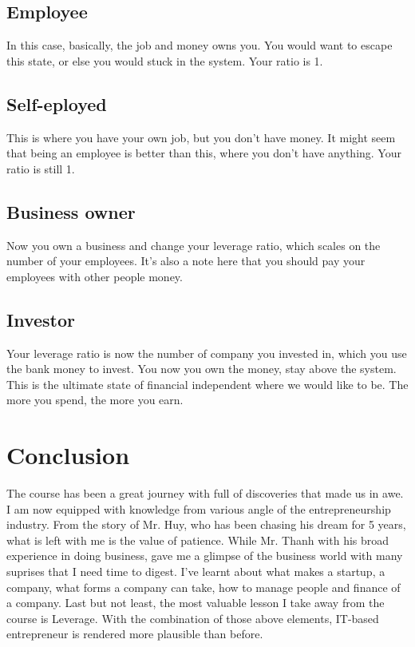 \documentclass[a4paper, 11pt]{article} %
\begin{document}
\subsection*{Employee}
In this case, basically, the job and money owns you. You would want to escape this state, or else you would stuck in the system. Your ratio is 1.
\subsection*{Self-eployed}
This is where you have your own job, but you don't have money. It might seem that being an employee is better than this, where you don't have anything. Your ratio is still 1.
\subsection*{Business owner}
Now you own a business and change your leverage ratio, which scales on the number of your employees. It's also a note here that you should pay your employees with other people money. 
\subsection*{Investor}
Your leverage ratio is now the number of company you invested in, which you use the bank money to invest. You now you own the money, stay above the system. This is the ultimate state of financial independent where we would like to be. The more you spend, the more you earn.
\section*{Conclusion}
The course has been a great journey with full of discoveries that made us in awe. I am now equipped with knowledge from various angle of the entrepreneurship industry. From the story of Mr. Huy, who has been chasing his dream for 5 years, what is left with me is the value of patience. While Mr. Thanh with his broad experience in doing business, gave me a glimpse of the business world with many suprises that I need time to digest. I've learnt about what makes a startup, a company, what forms a company can take, how to manage people and finance of a company. Last but not least, the most valuable lesson I take away from the course is Leverage. With the combination of those above elements, IT-based entrepreneur is rendered more plausible than before.


\end{document}
